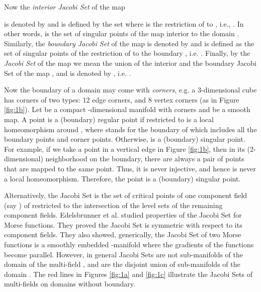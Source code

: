 \documentclass[twocolumn]{article}
\newcommand{\figref}[1]{Figure \ref{fig:#1}}
\newcommand{\twofigref}[2]{Figures \ref{fig:#1} and \ref{fig:#2}}
\begin{document}
Now the \emph{interior Jacobi Set} of  the map

is denoted by  and is defined by the set 
 \cite{2004-edels-jacobi} where
 is the restriction of  to , i.e., .
In other words,  is the set of singular points of the map
 interior to the domain . Similarly, the \emph{boundary Jacobi
  Set} of the map  is denoted by  and is defined as the set of singular points of the
restriction of  to the boundary , i.e.  . 
Finally, by the \emph{Jacobi Set} of the map  we mean
the union of the interior and the boundary Jacobi Set of the map ,
and is denoted by , i.e. . 

Now the boundary of a domain may come with \emph{corners}, e.g. a
3-dimensional cube has corners
of two types: 12 edge corners, and 8 vertex corners (as in \figref{1b}). Let  be a compact -dimensional manifold
with corners and  be a smooth
map. A point  is a (boundary)
regular point if  restricted to 
is a local homeomorphism around , where
 stands for the boundary of  which
includes all the boundary points and corner points.
Otherwise,  is a (boundary) singular point.
For example, if we take a point in a vertical edge in \figref{1b},
then in its (2-dimensional) neighborhood on
the boundary, there are always a pair of points
that are mapped to the same point.
Thus, it is never injective, and hence is never a
local homeomorphism. Therefore, the point
is a (boundary) singular point.


Alternatively, the Jacobi Set is the set of  critical
points of one component field (say ) of  restricted to the intersection of the level
sets of the remaining component fields. Edelsbrunner et al. \cite{2004-edels-jacobi} studied properties of the Jacobi Set for 
Morse functions. They proved the Jacobi Set is symmetric with respect to its component
fields. They also showed, generically, the Jacobi Set of two Morse functions is a smoothly embedded
-manifold where the gradients of the functions become
parallel. However, in general Jacobi Sets
are not sub-manifolds of the domain of the multi-field ,
and are the disjoint union of sub-manifolds
of the domain \cite{2004-edels-jacobi}. 
The red lines in \twofigref{1a}{1c}
illustrate the Jacobi Sets of multi-fields on domains without boundary.
\end{document}
